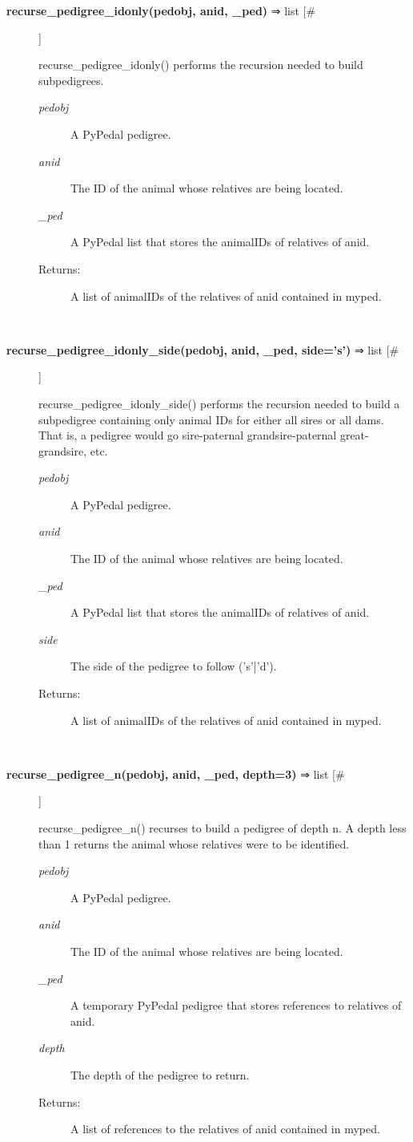 \begin{description}
\item[\textbf{recurse\_pedigree\_idonly(pedobj, anid, \_ped)}
 ⇒ list [\#]]

 recurse\_pedigree\_idonly() performs the recursion needed to build subpedigrees.
\begin{description}
\item[\emph{pedobj}
] A PyPedal pedigree.
\item[\emph{anid}
] The ID of the animal whose relatives are being located.
\item[\emph{\_ped}
] A PyPedal list that stores the animalIDs of relatives of anid.
\item[Returns:] A list of animalIDs of the relatives of anid contained in myped.

\end{description}
\\ 

\item[\textbf{recurse\_pedigree\_idonly\_side(pedobj, anid, \_ped, side='s')}
 ⇒ list [\#]]

 recurse\_pedigree\_idonly\_side() performs the recursion needed to build a subpedigree containing only animal IDs for either all sires or all dams. That is, a pedigree would go sire-paternal grandsire-paternal great-grandsire, etc.
\begin{description}
\item[\emph{pedobj}
] A PyPedal pedigree.
\item[\emph{anid}
] The ID of the animal whose relatives are being located.
\item[\emph{\_ped}
] A PyPedal list that stores the animalIDs of relatives of anid.
\item[\emph{side}
] The side of the pedigree to follow ('s'|'d').
\item[Returns:] A list of animalIDs of the relatives of anid contained in myped.

\end{description}
\\ 

\item[\textbf{recurse\_pedigree\_n(pedobj, anid, \_ped, depth=3)}
 ⇒ list [\#]]

 recurse\_pedigree\_n() recurses to build a pedigree of depth n. A depth less than 1 returns the animal whose relatives were to be identified.
\begin{description}
\item[\emph{pedobj}
] A PyPedal pedigree.
\item[\emph{anid}
] The ID of the animal whose relatives are being located.
\item[\emph{\_ped}
] A temporary PyPedal pedigree that stores references to relatives of anid.
\item[\emph{depth}
] The depth of the pedigree to return.
\item[Returns:] A list of references to the relatives of anid contained in myped.


\end{description}
\end{description}
